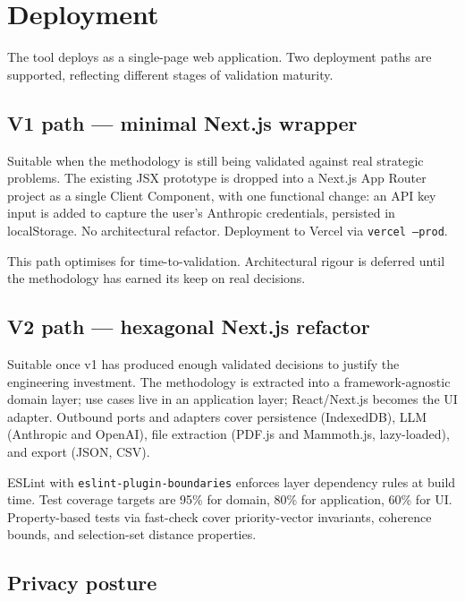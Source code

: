\documentclass[11pt,a4paper]{article}
\begin{document}
\section{Deployment}

The tool deploys as a single-page web application. Two deployment paths are supported, reflecting different stages of validation maturity.

\subsection{V1 path — minimal Next.js wrapper}

Suitable when the methodology is still being validated against real strategic problems. The existing JSX prototype is dropped into a Next.js App Router project as a single Client Component, with one functional change: an API key input is added to capture the user's Anthropic credentials, persisted in localStorage. No architectural refactor. Deployment to Vercel via \texttt{vercel --prod}.

This path optimises for time-to-validation. Architectural rigour is deferred until the methodology has earned its keep on real decisions.

\subsection{V2 path — hexagonal Next.js refactor}

Suitable once v1 has produced enough validated decisions to justify the engineering investment. The methodology is extracted into a framework-agnostic domain layer; use cases live in an application layer; React/Next.js becomes the UI adapter. Outbound ports and adapters cover persistence (IndexedDB), LLM (Anthropic and OpenAI), file extraction (PDF.js and Mammoth.js, lazy-loaded), and export (JSON, CSV).

ESLint with \texttt{eslint-plugin-boundaries} enforces layer dependency rules at build time. Test coverage targets are 95\% for domain, 80\% for application, 60\% for UI. Property-based tests via fast-check cover priority-vector invariants, coherence bounds, and selection-set distance properties.

\subsection{Privacy posture}
\end{document}
